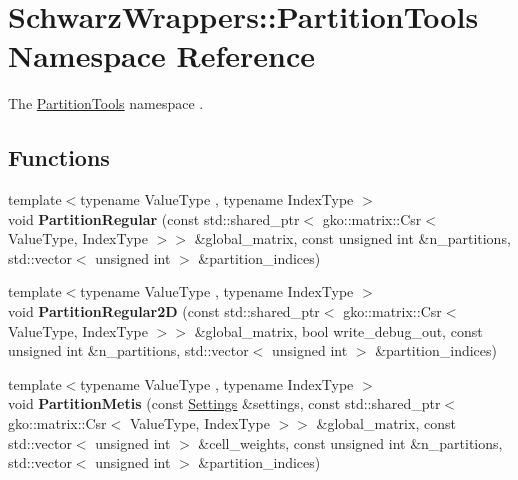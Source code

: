 \hypertarget{namespaceSchwarzWrappers_1_1PartitionTools}{}\section{Schwarz\+Wrappers\+:\+:Partition\+Tools Namespace Reference}
\label{namespaceSchwarzWrappers_1_1PartitionTools}


The \hyperlink{namespaceSchwarzWrappers_1_1PartitionTools}{Partition\+Tools} namespace .  


\subsection*{Functions}
\begin{DoxyCompactItemize}
\item 
\mbox{\label{namespaceSchwarzWrappers_1_1PartitionTools_a87b648eff8c1666975eda209bd82bdcd}} 
{\footnotesize template$<$typename Value\+Type , typename Index\+Type $>$ }\\void {\bfseries Partition\+Regular} (const std\+::shared\+\_\+ptr$<$ gko\+::matrix\+::\+Csr$<$ Value\+Type, Index\+Type $>$$>$ \&global\+\_\+matrix, const unsigned int \&n\+\_\+partitions, std\+::vector$<$ unsigned int $>$ \&partition\+\_\+indices)
\item 
\mbox{\label{namespaceSchwarzWrappers_1_1PartitionTools_a146c3b902cc358578930e448929a27d9}} 
{\footnotesize template$<$typename Value\+Type , typename Index\+Type $>$ }\\void {\bfseries Partition\+Regular2D} (const std\+::shared\+\_\+ptr$<$ gko\+::matrix\+::\+Csr$<$ Value\+Type, Index\+Type $>$$>$ \&global\+\_\+matrix, bool write\+\_\+debug\+\_\+out, const unsigned int \&n\+\_\+partitions, std\+::vector$<$ unsigned int $>$ \&partition\+\_\+indices)
\item 
\mbox{\label{namespaceSchwarzWrappers_1_1PartitionTools_ac956f0e7a83da242c03067055dd6f71f}} 
{\footnotesize template$<$typename Value\+Type , typename Index\+Type $>$ }\\void {\bfseries Partition\+Metis} (const \hyperlink{structSchwarzWrappers_1_1Settings}{Settings} \&settings, const std\+::shared\+\_\+ptr$<$ gko\+::matrix\+::\+Csr$<$ Value\+Type, Index\+Type $>$$>$ \&global\+\_\+matrix, const std\+::vector$<$ unsigned int $>$ \&cell\+\_\+weights, const unsigned int \&n\+\_\+partitions, std\+::vector$<$ unsigned int $>$ \&partition\+\_\+indices)
$$
\end{DoxyCompactItemize}
